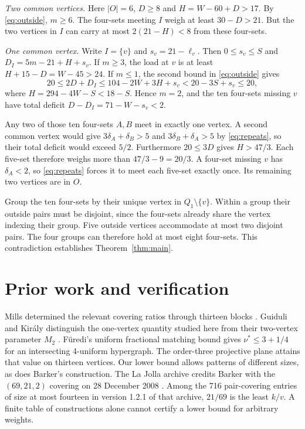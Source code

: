 \documentclass[11pt]{article}
\begin{document}
\emph{Two common vertices.}
Here \(|O|=6\), \(D\ge8\) and \(H=W-60+D>17\). By
\eqref{eq:outside}, \(m\ge6\). The four-sets meeting \(I\) weigh at
least \(30-D>21\). But the two vertices in \(I\) can carry at most
\(2(21-H)<8\) from these four-sets.

\emph{One common vertex.}
Write \(I=\{v\}\) and \(s_v=21-\ell_v\). Then \(0\le s_v\le S\) and
\(D_I=5m-21+H+s_v\). If \(m\ge3\), the load at \(v\) is at least
\(H+15-D=W-45>24\). If \(m\le1\), the second bound in
\eqref{eq:outside} gives
\[
20\le2D+D_I\le104-2W+3H+s_v
 <20-3S+s_v\le20,
\]
where \(H=294-4W-S<18-S\). Hence \(m=2\), and the ten four-sets
missing \(v\) have total deficit \(D-D_I=71-W-s_v<2\).

Any two of those ten four-sets \(A,B\) meet in exactly one vertex. A
second common vertex would give \(3\delta_A+\delta_B>5\) and
\(3\delta_B+\delta_A>5\) by \eqref{eq:repeats}, so their total deficit
would exceed \(5/2\). Furthermore \(20\le3D\) gives \(H>47/3\).
Each five-set therefore weighs more than \(47/3-9=20/3\). A four-set
missing \(v\) has \(\delta_A<2\), so \eqref{eq:repeats} forces it to
meet each five-set exactly once. Its remaining two vertices are in \(O\).

Group the ten four-sets by their unique vertex in \(Q_1\setminus\{v\}\).
Within a group their outside pairs must be disjoint, since the four-sets
already share the vertex indexing their group. Five outside vertices
accommodate at most two disjoint pairs. The four groups can therefore
hold at most eight four-sets. This contradiction establishes
Theorem~\ref{thm:main}.

\section*{Prior work and verification}
Mills determined the relevant covering ratios through thirteen blocks
\cite{mills,hhs}. Guiduli and Kir\'aly distinguish the one-vertex
quantity studied here from their two-vertex parameter \(M_2\) \cite{gk}.
F\"uredi's uniform fractional matching bound \cite{furedi} gives
\(\nu^*\le 3+1/4\) for an intersecting 4-uniform hypergraph.
The order-three projective plane attains that value on thirteen vertices.
Our lower bound allows patterns of different sizes, as does Barker's
construction. The La Jolla archive credits Barker with the
\((69,21,2)\) covering on 28 December 2008 \cite{barker}. Among the
716 pair-covering entries of size at most fourteen in version 1.2.1 of
that archive, \(21/69\) is the least \(k/v\). A finite table of
constructions alone cannot certify a lower bound for arbitrary weights.
\end{document}
